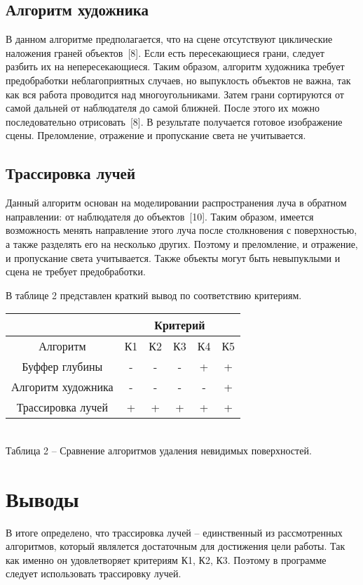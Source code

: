 {    \subsection{Алгоритм художника} {
        В данном алгоритме предполагается, что на сцене отсутствуют циклические
        наложения граней объектов~[8].
        Если есть пересекающиеся грани, следует разбить их на непересекающиеся.
        Таким образом, алгоритм художника требует предобработки неблагоприятных
        случаев, но выпуклость объектов не важна,
        так как вся работа проводится над многоугольниками.
        Затем грани сортируются от самой дальней от наблюдателя до самой ближней.
        После этого их можно последовательно отрисовать~[8].
        В результате получается готовое изображение сцены.
        Преломление, отражение и пропускание света не учитывается.
    }

    \subsection{Трассировка лучей} {
        Данный алгоритм основан на моделировании распространения луча в
        обратном направлении: от наблюдателя до объектов~[10].
        Таким образом, имеется возможность менять направление этого луча
        после столкновения с поверхностью, а также разделять его на несколько других.
        Поэтому и преломление, и отражение, и пропускание света учитывается.
        Также объекты могут быть невыпуклыми и сцена не требует предобработки.
    }
    
    В таблице 2 представлен краткий вывод по соответствию критериям.
    
    \begin{center}
        \begin{tabular} { |c|c|c|c|c|c| }
            \hline
            \hspace{0pt} & \multicolumn{5}{|c|}{Критерий} \\
            \hline
            Алгоритм & К1 & К2 & К3 & К4 & К5 \\
            \hline
            Буффер глубины & - & - & - & + & + \\
            \hline
            Алгоритм художника & - & - & - & - & +  \\
            \hline
            Трассировка лучей & + & + & + & + & + \\
            \hline
        \end{tabular}
        \\
        \vspace{2mm}
        \small {
            Таблица 2 -- Сравнение алгоритмов удаления невидимых поверхностей.
        }
    \end{center}

    \section*{Выводы} {
        В итоге определено, что трассировка лучей -- единственный из
        рассмотренных алгоритмов, который являлется достаточным для достижения
        цели работы.
        Так как именно он удовлетворяет критериям К1, К2, К3.
        Поэтому в программе следует использовать трассировку лучей.
    }
}